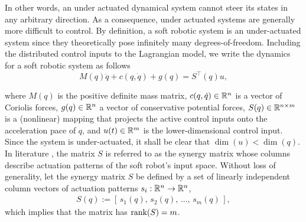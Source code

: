 \noindent In other words, an under actuated dynamical system cannot steer its states in any arbitrary direction. As a consequence, under actuated systems are generally more difficult to control. By definition, a soft robotic system is an under-actuated system since they theoretically pose infinitely many degrees-of-freedom. Including the distributed control inputs to the Lagrangian model, we write the dynamics for a soft robotic system as follows
\begin{equation}
M(q)\ddot{q} + c(q,\dot{q}) + g(q)= S^\top(q) u,
\end{equation}

\noindent where $M(q)$ is the positive definite mass matrix, $c(q,\dot{q})\in \mathbb{R}^{n}$ is a vector of Coriolis forces, $g(q)\in \mathbb{R}^{n}$ a vector of conservative potential forces, $S(q) \in \mathbb{R}^{n\times m}$ is a (nonlinear) mapping that projects the active control inputs onto the acceleration pace of ${q}$, and $u(t) \in \mathbb{R}^{m}$ is the lower-dimensional control input. Since the system is under-actuated, it shall be clear that $\dim(u) < \dim(q)$. In literature \cite{Santina2019}, the matrix $S$ is referred to as the synergy matrix whose columns describe actuation patterns of the soft robot's input space. Without loss of generality, let the synergy matrix $S$ be defined by a set of linearly independent column vectors of actuation patterns $s_i: \mathbb{R}^n \to \mathbb{R}^n$,
\begin{align}
S(q) := \left[\,s_1(q),\,s_2(q),\,...,\,s_m(q)\,\right], 
\end{align}
which implies that the matrix has $\textnormal{rank}(S) = m$. 

